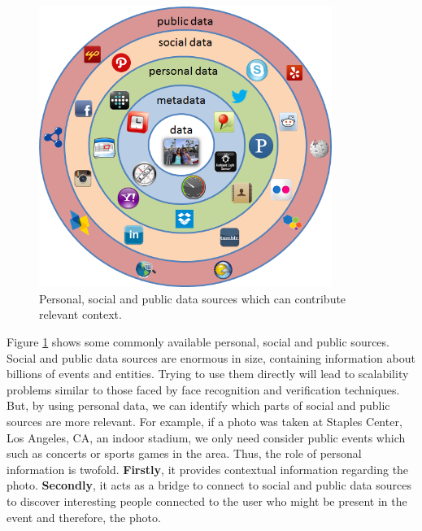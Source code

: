 \begin{figure}[h]
\centering
\includegraphics[width=0.85\textwidth]{media/chapter2/personal-social-public-data-sources.png}
\caption{Personal, social and public data sources which can contribute relevant context.}
\label{fig:personal-social-public-sources}
\end{figure}

Figure \ref{fig:personal-social-public-sources} shows some commonly available personal, social and public sources. Social and public data sources are enormous in size, containing information about billions of events and entities. Trying to use them directly will lead to scalability problems similar to those faced by face recognition and verification techniques. But, by using personal data, we can identify which parts of social and public sources are more relevant. For example, if a photo was taken at Staples Center, Los Angeles, CA, an indoor stadium, we only need consider public events which such as concerts or sports games in the area. Thus, the role of personal information is twofold. \textbf{Firstly}, it provides contextual information regarding the photo. \textbf{Secondly}, it acts as a bridge to connect to social and public data sources to discover interesting people connected to the user who might be present in the event and therefore, the photo.

